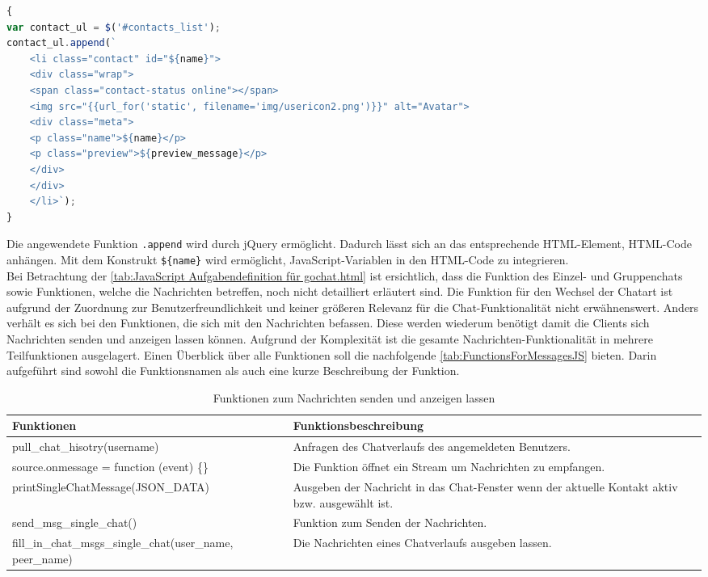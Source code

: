 \documentclass[a4paper,titlepage,halfparskip,12pt]{scrreprt}
\begin{document}
\begin{onehalfspacing}
\begin{lstlisting}[language=Javascript,caption=Hinzufügen des Kontaktes mithilfe von HTML-Elementen,label={lst:AddContacttoList}]
{
var contact_ul = $('#contacts_list');
contact_ul.append(`
	<li class="contact" id="${name}">
	<div class="wrap">
	<span class="contact-status online"></span>
	<img src="{{url_for('static', filename='img/usericon2.png')}}" alt="Avatar">
	<div class="meta">
	<p class="name">${name}</p>
	<p class="preview">${preview_message}</p>
	</div>
	</div>
	</li>`);
}
\end{lstlisting}  
Die angewendete Funktion \texttt{.append} wird durch jQuery ermöglicht. Dadurch lässt sich an das entsprechende HTML-Element, HTML-Code anhängen. Mit dem Konstrukt \texttt{\$\{name\}} wird ermöglicht, JavaScript-Variablen in den HTML-Code zu integrieren.\\ 
Bei Betrachtung der \autoref{tab:JavaScript Aufgabendefinition für gochat.html} ist ersichtlich, dass die Funktion des Einzel- und Gruppenchats sowie Funktionen, welche die Nachrichten betreffen, noch nicht detailliert erläutert sind. Die Funktion für den Wechsel der Chatart ist aufgrund der Zuordnung zur Benutzerfreundlichkeit und keiner größeren Relevanz für die Chat-Funktionalität nicht erwähnenswert. Anders verhält es sich bei den Funktionen, die sich mit den Nachrichten befassen. Diese werden wiederum benötigt damit die Clients sich Nachrichten senden und anzeigen lassen können. Aufgrund der Komplexität ist die gesamte Nachrichten-Funktionalität in mehrere Teilfunktionen ausgelagert. Einen Überblick über alle Funktionen soll die nachfolgende \autoref{tab:FunctionsForMessagesJS} bieten. Darin aufgeführt sind sowohl die Funktionsnamen als auch eine kurze Beschreibung der Funktion.
\begin{table}[h]
	\centering
	\caption{Funktionen zum Nachrichten senden und anzeigen lassen}
	\begin{tabular}{|p{6cm}|p{8.8cm}|}
		\hline
		\textbf{Funktionen} & \textbf{Funktionsbeschreibung} \\
		\hline
		pull\_chat\_hisotry(username) & Anfragen des Chatverlaufs des angemeldeten Benutzers.\\
		\hline
		source.onmessage = function (event) \{\} & Die Funktion öffnet ein \glqq Stream\grqq{} um Nachrichten zu empfangen.\\
		\hline
		printSingleChatMessage\linebreak(JSON\_DATA) & Ausgeben der Nachricht in das Chat-Fenster wenn der aktuelle Kontakt aktiv bzw. ausgewählt ist.\\
		\hline
		send\_msg\_single\_chat() & Funktion zum Senden der Nachrichten.\\
		\hline
		fill\_in\_chat\_msgs\_single\_chat\linebreak(user\_name, peer\_name) & Die Nachrichten eines Chatverlaufs ausgeben lassen.\\
		\hline
	\end{tabular}
	\label{tab:FunctionsForMessagesJS}
\end{table}


\end{onehalfspacing}
\end{document}
